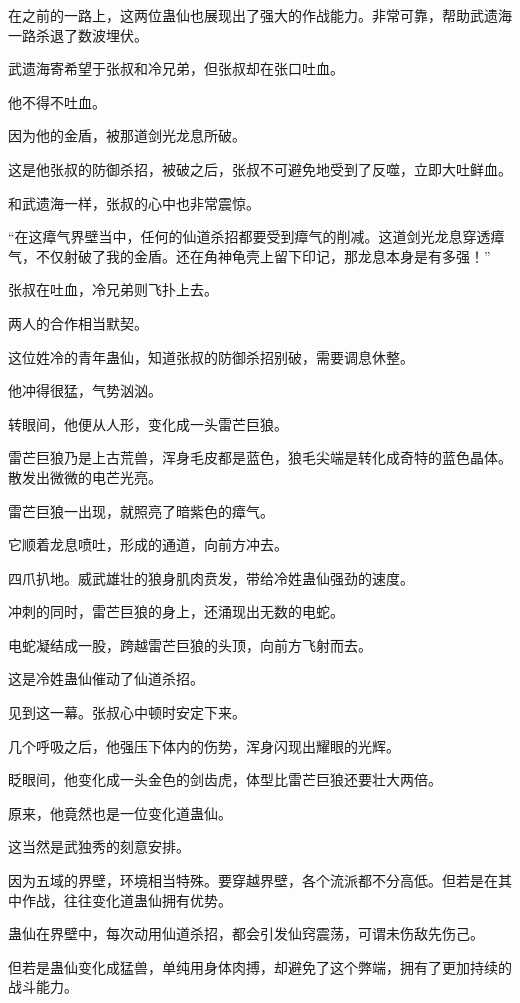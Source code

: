 \begin{this_body}
在之前的一路上，这两位蛊仙也展现出了强大的作战能力。非常可靠，帮助武遗海一路杀退了数波埋伏。

武遗海寄希望于张叔和冷兄弟，但张叔却在张口吐血。

他不得不吐血。

因为他的金盾，被那道剑光龙息所破。

这是他张叔的防御杀招，被破之后，张叔不可避免地受到了反噬，立即大吐鲜血。

和武遗海一样，张叔的心中也非常震惊。

“在这瘴气界壁当中，任何的仙道杀招都要受到瘴气的削减。这道剑光龙息穿透瘴气，不仅射破了我的金盾。还在角神龟壳上留下印记，那龙息本身是有多强！”

张叔在吐血，冷兄弟则飞扑上去。

两人的合作相当默契。

这位姓冷的青年蛊仙，知道张叔的防御杀招别破，需要调息休整。

他冲得很猛，气势汹汹。

转眼间，他便从人形，变化成一头雷芒巨狼。

雷芒巨狼乃是上古荒兽，浑身毛皮都是蓝色，狼毛尖端是转化成奇特的蓝色晶体。散发出微微的电芒光亮。

雷芒巨狼一出现，就照亮了暗紫色的瘴气。

它顺着龙息喷吐，形成的通道，向前方冲去。

四爪扒地。威武雄壮的狼身肌肉贲发，带给冷姓蛊仙强劲的速度。

冲刺的同时，雷芒巨狼的身上，还涌现出无数的电蛇。

电蛇凝结成一股，跨越雷芒巨狼的头顶，向前方飞射而去。

这是冷姓蛊仙催动了仙道杀招。

见到这一幕。张叔心中顿时安定下来。

几个呼吸之后，他强压下体内的伤势，浑身闪现出耀眼的光辉。

眨眼间，他变化成一头金色的剑齿虎，体型比雷芒巨狼还要壮大两倍。

原来，他竟然也是一位变化道蛊仙。

这当然是武独秀的刻意安排。

因为五域的界壁，环境相当特殊。要穿越界壁，各个流派都不分高低。但若是在其中作战，往往变化道蛊仙拥有优势。

蛊仙在界壁中，每次动用仙道杀招，都会引发仙窍震荡，可谓未伤敌先伤己。

但若是蛊仙变化成猛兽，单纯用身体肉搏，却避免了这个弊端，拥有了更加持续的战斗能力。


\end{this_body}
